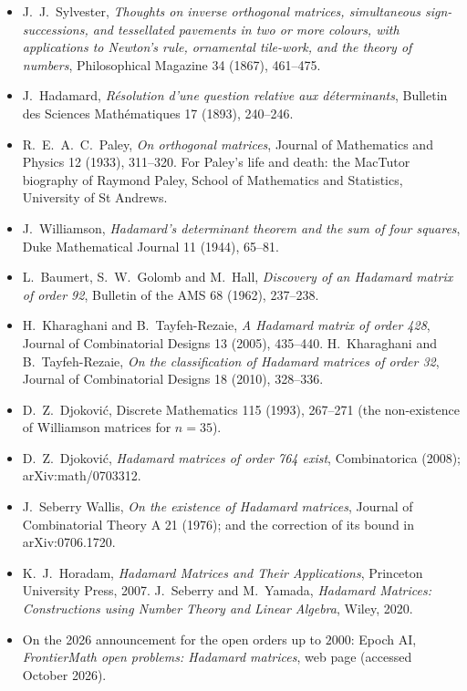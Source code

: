 \begin{itemize}
\item J.~J.~Sylvester, \emph{Thoughts on inverse orthogonal matrices, simultaneous sign-successions, and tessellated pavements in two or more colours,
with applications to Newton's rule, ornamental tile-work, and the theory of numbers}, Philosophical Magazine 34 (1867), 461--475.
\item J.~Hadamard, \emph{R\'esolution d'une question relative aux d\'eterminants}, Bulletin des Sciences Math\'ematiques 17 (1893), 240--246.
\item R.~E.~A.~C.~Paley, \emph{On orthogonal matrices}, Journal of Mathematics and Physics 12 (1933), 311--320. For Paley's life and death: the MacTutor
biography of Raymond Paley, School of Mathematics and Statistics, University of St Andrews.
\item J.~Williamson, \emph{Hadamard's determinant theorem and the sum of four squares}, Duke Mathematical Journal 11 (1944), 65--81.
\item L.~Baumert, S.~W.~Golomb and M.~Hall, \emph{Discovery of an Hadamard matrix of order 92}, Bulletin of the AMS 68 (1962), 237--238.
\item H.~Kharaghani and B.~Tayfeh-Rezaie, \emph{A Hadamard matrix of order 428}, Journal of Combinatorial Designs 13 (2005), 435--440.
H.~Kharaghani and B.~Tayfeh-Rezaie, \emph{On the classification of Hadamard matrices of order 32}, Journal of Combinatorial Designs 18 (2010), 328--336.
\item D.~Z.~Djokovi\'c, Discrete Mathematics 115 (1993), 267--271 (the non-existence of Williamson matrices for $n=35$).
\item D.~Z.~Djokovi\'c, \emph{Hadamard matrices of order 764 exist}, Combinatorica (2008); arXiv:\allowbreak math/0703312.
\item J.~Seberry Wallis, \emph{On the existence of Hadamard matrices}, Journal of Combinatorial Theory A 21 (1976); and the correction of its bound in
arXiv:0706.1720.
\item K.~J.~Horadam, \emph{Hadamard Matrices and Their Applications}, Princeton University Press, 2007. J.~Seberry and M.~Yamada, \emph{Hadamard
Matrices: Constructions using Number Theory and Linear Algebra}, Wiley, 2020.
\item On the 2026 announcement for the open orders up to $2000$: Epoch AI, \emph{FrontierMath open problems: Hadamard matrices}, web page (accessed
October 2026).
\end{itemize}
